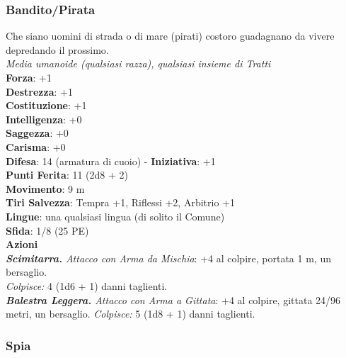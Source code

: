 \begin{multicols}{2}
\subsubsection{Bandito/Pirata}
Che siano uomini di strada o di mare (pirati) costoro guadagnano da vivere depredando il prossimo.\\
\emph{Media umanoide (qualsiasi razza), qualsiasi insieme di Tratti}\\
\textbf{Forza}: +1\\
\textbf{Destrezza}: +1\\
\textbf{Costituzione}: +1\\
\textbf{Intelligenza}: +0\\
\textbf{Saggezza}: +0\\
\textbf{Carisma}: +0\\
\textbf{Difesa}: 14 (armatura di cuoio) - \textbf{Iniziativa}: +1\\
\textbf{Punti Ferita}: 11 (2d8 + 2)\\
\textbf{Movimento}: 9 m\\
\textbf{Tiri Salvezza}: Tempra +1, Riflessi +2, Arbitrio +1 \\
\textbf{Lingue}: una qualsiasi lingua (di solito il Comune)\\
\textbf{Sfida}: 1/8 (25 PE)\smallskip\\
\smallskip\textbf{Azioni}\\
\emph{\textbf{Scimitarra.} Attacco con Arma da Mischia}: +4 al colpire, portata 1 m, un bersaglio.\\
\emph{Colpisce:} 4 (1d6 + 1) danni taglienti.\\
\emph{\textbf{Balestra Leggera.} Attacco con Arma a Gittata}: +4 al colpire, gittata 24/96 metri, un bersaglio. \emph{Colpisce:} 5 (1d8 + 1) danni taglienti.\\

\subsubsection{Spia}


\end{multicols}
